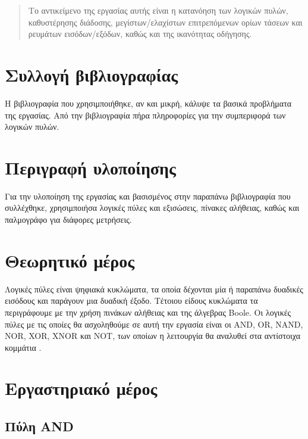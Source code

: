 \documentclass{article}
\begin{document}
\begin{titlepage}
\maketitle
\end{titlepage}

\renewcommand{\contentsname}{Περιεχόμενα}
\tableofcontents

\renewcommand{\abstractname}{Εισαγωγή}
\begin{abstract}
    Το αντικείμενο της εργασίας αυτής είναι η κατανόηση των λογικών πυλών,
    καθυστέρησης διάδοσης, μεγίστων/ελαχίστων επιτρεπόμενων ορίων τάσεων και ρευμάτων
    εισόδων/εξόδων, καθώς και της ικανότητας οδήγησης.
\end{abstract}
\pagebreak

\section{Συλλογή βιβλιογραφίας}
Η βιβλιογραφία που χρησιμποιήθηκε, αν και μικρή, κάλυψε τα βασικά προβλήματα της εργασίας.
Από την βιβλιογραφία πήρα πληροφορίες για την συμπεριφορά των λογικών πυλών.

\section{Περιγραφή υλοποίησης}
Για την υλοποίηση της εργασίας και βασισμένος στην παραπάνω βιβλιογραφία που συλλέχθηκε,
χρησιμποιήσα λογικές πύλες και εξισώσεις, πίνακες αλήθειας, καθώς και παλμογράφο για διάφορες
μετρήσεις.

\section{Θεωρητικό μέρος}
Λογικές πύλες είναι ψηφιακά κυκλώματα, τα οποία δέχονται μία ή παραπάνω δυαδικές
εισόδους και παράγουν μια δυαδική έξοδο. Τέτοιου είδους κυκλώματα τα περιγράφουμε με
την χρήση πινάκων αλήθειας και της άλγεβρας Boole. Οι λογικές πύλες με τις οποίες
θα ασχοληθούμε σε αυτή την εργασία είναι οι AND, OR, NAND, NOR, XOR, XNOR και NOT,
των οποίων η λειτουργία θα αναλυθεί στα αντίστοιχα κομμάτια \cite{efstathiou}.

\section{Εργαστηριακό μέρος}
\subsection{Πύλη AND}
\end{document}
